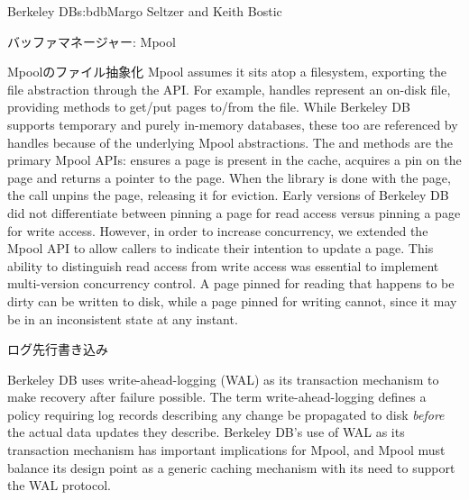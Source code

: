 \begin{aosachapter}{Berkeley DB}{s:bdb}{Margo Seltzer and Keith Bostic}
\begin{aosasect1}{バッファマネージャー: Mpool}
\begin{aosasect2}{Mpoolのファイル抽象化}
Mpool assumes it sits atop a filesystem, exporting the file
abstraction through the API\@. For example,  handles
represent an on-disk file, providing methods to get/put pages to/from
the file.  While Berkeley DB supports temporary and purely in-memory
databases, these too are referenced by  handles
because of the underlying Mpool abstractions. The  and
 methods are the primary Mpool APIs:  ensures a
page is present in the cache, acquires a pin on the page and returns a
pointer to the page.  When the library is done with the page, the
 call unpins the page, releasing it for 
eviction.  Early versions of Berkeley DB did not differentiate between
pinning a page for read access versus pinning a page for write
access. However, in order to increase concurrency, we extended the
Mpool API to allow callers to indicate their intention to update a
page. This ability to distinguish read access from write access was
essential to implement multi-version concurrency control.
A page pinned for reading that happens to be dirty can be written to
disk, while a page pinned for writing cannot, since it may be in an
inconsistent state at any instant.

\end{aosasect2}

\begin{aosasect2}{ログ先行書き込み}

Berkeley DB uses write-ahead-logging (WAL) as its transaction
mechanism to make recovery after failure possible.  The term
write-ahead-logging defines a policy requiring log records describing
any change be propagated to disk \emph{before} the actual data updates
they describe. Berkeley DB's use of WAL as its transaction mechanism
has important implications for Mpool, and Mpool must balance its
design point as a generic caching mechanism with its need to support
the WAL protocol.


\end{aosasect2}
\end{aosasect1}
\end{aosachapter}
